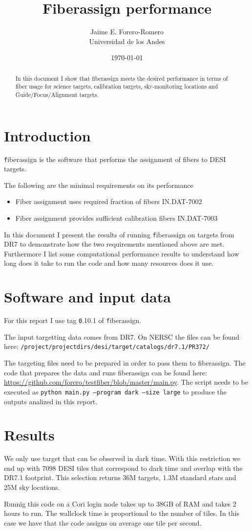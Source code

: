 \documentclass{article}
\title{Fiberassign performance}
\author{Jaime E. Forero-Romero\\Universidad de los Andes}
\date{\today}
\begin{document}
\maketitle
\begin{abstract}
In this document I show that fiberassign meets the desired performance in terms of fiber usage for science targets, calibration targets, sky-monitoring locations and Guide/Focus/Alignment targets.
\end{abstract}

\section{Introduction}
{\texttt fiberassign} is the software that performs the assignment of
fibers to DESI targets. 

The following are the minimal requirements on its performance
\begin{itemize}
\item Fiber assignment uses required fraction of fibers IN.DAT-7002
\item Fiber assignment provides sufficient calibration fibers IN.DAT-7003
\end{itemize}
In this document I present the results of running {\texttt
  fiberassign} on targets from DR7 to demonstrate how the two
requirements mentioned above are met. 
Furthermore I list some computational performance results to
understand how long does it take to run the code and how many
resources does it use.

\section{Software and input data}

For this report I use tag {\texttt 0.10.1} of {\texttt fiberassign}. 

The input targetting data comes from DR7. On NERSC the files can be found here:
{\texttt{/project/projectdirs/desi/target/catalogs/dr7.1/PR372/}}

The targeting files need to be prepared in order to pass them to
fiberassign.
The code that prepares the data and runs fiberassign can be found
here:
\url{https://github.com/forero/testfiber/blob/master/main.py}.
The script needs to be executed as {\texttt{python main.py --program dark
--size large}} to produce the outputs analized in this report.


\section{Results}


We only use target that can be observed in dark time. 
With this restriction we end up with 7098 DESI tiles that correspond
to dark time and overlap with the DR7.1 footprint. 
This selection returns 36M targets, 1.3M standard stars and
25M sky locations.

Runnig this code on a Cori login node takes up to 38GB of RAM and
takes 2 hours to run. The wallclock time is proportional to the number
of tiles. In this case we have that the code assigns on average one
tile per second. 
\end{document}
